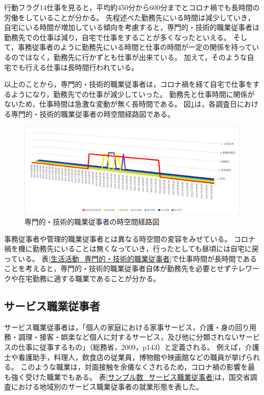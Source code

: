 \documentclass[paper={210mm,297mm},fontsize=15Q,line_length=35zw,number_of_lines=31,head_space=30mm,gutter=40mm,baselineskip=2.0zw,headfoot_verticalposition=1.5zw]{jlreq}
\begin{document}
行動フラグ14仕事を見ると，平均約450分から600分までとコロナ禍でも長時間の労働をしていることが分かる。
先程述べた勤務先にいる時間は減少していき，自宅にいる時間が増加している傾向を考慮すると，専門的・技術的職業従事者は勤務先での仕事は減り，自宅で仕事をすることが多くなったといえる。
そして，事務従事者のように勤務先にいる時間と仕事の時間が一定の関係を持っているのではなく，勤務先に行かずとも仕事が出来ている。
加えて，そのような自宅でも行える仕事は長時間行われている。

以上のことから，専門的・技術的職業従事者は，コロナ禍を経て自宅で仕事をするようになり，勤務先での仕事が減少していった。
勤務先と仕事時間に関係がないため，仕事時間は急激な変動が無く長時間である。
図\ref{時空間経路図_専門的・技術的職業従事者}は，各調査日における専門的・技術的職業従事者の時空間経路図である。

\begin{figure}[H]
  \centering
  \includegraphics[width=122mm]{../Figure/c04s03_fig_時空間経路図-専門的・技術的職業従事者.png}
  \caption{専門的・技術的職業従事者の時空間経路図}
  \label{時空間経路図_専門的・技術的職業従事者}
\end{figure}

事務従事者や管理的職業従事者とは異なる時空間の変容をみせている。
コロナ禍を機に勤務先にいることは無くなっていき，行ったとしても昼頃には自宅に戻っている。
表\ref{生活活動_専門的・技術的職業従事者}で仕事時間が長時間であることを考えると，専門的・技術的職業従事者自体が勤務先を必要とせずテレワークや在宅勤務に適する職業であることが分かる。

\subsection{サービス職業従事者}

サービス職業従事者は，「個人の家庭における家事サービス，介護・身の回り用務・調理・接客・娯楽など個人に対するサービス，及び他に分類されないサービスの仕事に従事するもの」（総務省，2009，p143）と定義される。
例えば，介護士や看護助手，料理人，飲食店の従業員，博物館や映画館などの職員が挙げられる。
このような職業は，対面接触を余儀なくされるため，コロナ禍の影響を最も強く受けた職業でもある。
表\ref{サンプル数_サービス職業従事者}は，国交省調査における地域別のサービス職業従事者の就業形態を表した。\\
\end{document}

